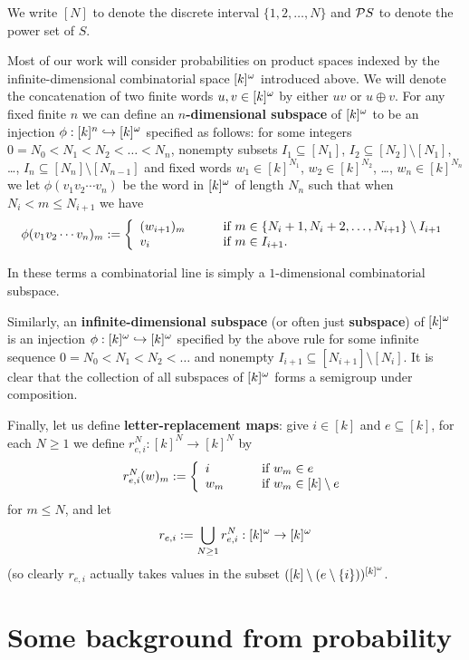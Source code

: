 \documentclass[11pt]{article}
\begin{document}
We write $[N]$ to denote the discrete interval $\{1,2,\ldots,N\}$
and $\cal{P}S$ to denote the power set of $S$.

Most of our work will consider probabilities on product spaces
indexed by the infinite-dimensional combinatorial space $[k]^\o$
introduced above. We will denote the concatenation of two finite
words $u,v \in [k]^\o$ by either $uv$ or $u\oplus v$.  For any fixed
finite $n$ we can define an \textbf{$n$-dimensional subspace} of
$[k]^\o$ to be an injection $\phi:[k]^n \into [k]^\o$ specified as
follows: for some integers $0 = N_0 < N_1 < N_2 < \ldots < N_n$,
nonempty subsets $I_1 \subseteq [N_1]$, $I_2 \subseteq
[N_2]\setminus [N_1]$, \ldots, $I_n \subseteq [N_n]\setminus
[N_{n-1}]$ and fixed words $w_1 \in [k]^{N_1}$, $w_2 \in [k]^{N_2}$,
\ldots, $w_n \in [k]^{N_n}$ we let $\phi(v_1v_2\cdots v_n)$ be the
word in $[k]^\o$ of length $N_n$ such that when $N_i < m \leq
N_{i+1}$ we have
\[\phi(v_1v_2\cdots v_n)_m := \left\{\begin{array}{ll}(w_{i+1})_m&\quad\quad\hbox{if }m\in \{N_i+1,N_i+2,\ldots,N_{i+1}\}\setminus I_{i+1}\\ v_i&\quad\quad\hbox{if }m\in I_{i+1}.\end{array}\right.\]

In these terms a combinatorial line is simply a $1$-dimensional
combinatorial subspace.

Similarly, an \textbf{infinite-dimensional subspace} (or often just
\textbf{subspace}) of $[k]^\o$ is an injection $\phi:[k]^\o \into
[k]^\o$ specified by the above rule for some infinite sequence $0 =
N_0 < N_1 < N_2 < \ldots$ and nonempty $I_{i+1} \subseteq
[N_{i+1}]\setminus [N_i]$.  It is clear that the collection of all
subspaces of $[k]^\o$ forms a semigroup under composition.

Finally, let us define \textbf{letter-replacement maps}: give $i\in
[k]$ and $e \subseteq [k]$, for each $N\geq 1$ we define
$r^N_{e,i}:[k]^N \to [k]^N$ by
\[r^N_{e,i}(w)_m := \left\{\begin{array}{ll}i&\quad\quad\hbox{if }w_m \in e\\ w_m&\quad\quad\hbox{if }w_m \in [k]\setminus e\end{array}\right.\]
for $m\leq N$, and let \[r_{e,i} := \bigcup_{N\geq
1}r^N_{e,i}:[k]^\o\to [k]^\o\] (so clearly $r_{e,i}$ actually takes
values in the subset $([k]\setminus (e\setminus\{i\}))^{[k]^\o}$.

\section{Some background from probability}
\end{document}
